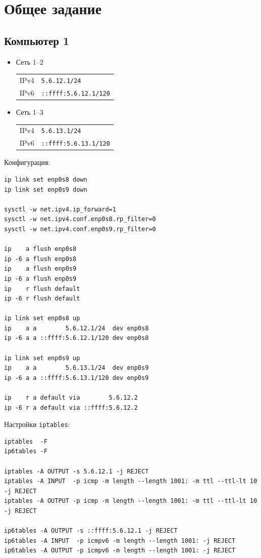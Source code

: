 
\newpage

\section{Общее задание}

\subsection{Компьютер 1}
\begin{itemize}
    \item Сеть 1--2

    \begin{tabular}{ll}
        IPv4 & \texttt{5.6.12.1/24}         \\
        IPv6 & \texttt{::ffff:5.6.12.1/120} \\
    \end{tabular}

    \item Сеть 1--3

    \begin{tabular}{ll}
        IPv4 & \texttt{5.6.13.1/24}         \\
        IPv6 & \texttt{::ffff:5.6.13.1/120} \\
    \end{tabular}
\end{itemize}

Конфигурация:
\begin{verbatim}
ip link set enp0s8 down
ip link set enp0s9 down

sysctl -w net.ipv4.ip_forward=1
sysctl -w net.ipv4.conf.enp0s8.rp_filter=0
sysctl -w net.ipv4.conf.enp0s9.rp_filter=0

ip    a flush enp0s8
ip -6 a flush enp0s8
ip    a flush enp0s9
ip -6 a flush enp0s9
ip    r flush default
ip -6 r flush default

ip link set enp0s8 up
ip    a a        5.6.12.1/24  dev enp0s8
ip -6 a a ::ffff:5.6.12.1/120 dev enp0s8

ip link set enp0s9 up
ip    a a        5.6.13.1/24  dev enp0s9
ip -6 a a ::ffff:5.6.13.1/120 dev enp0s9

ip    r a default via        5.6.12.2
ip -6 r a default via ::ffff:5.6.12.2
\end{verbatim}

Настройки \texttt{iptables}:
\begin{verbatim}
iptables  -F
ip6tables -F

iptables -A OUTPUT -s 5.6.12.1 -j REJECT
iptables -A INPUT  -p icmp -m length --length 1001: -m ttl --ttl-lt 10 -j REJECT
iptables -A OUTPUT -p icmp -m length --length 1001: -m ttl --ttl-lt 10 -j REJECT

ip6tables -A OUTPUT -s ::ffff:5.6.12.1 -j REJECT
ip6tables -A INPUT  -p icmpv6 -m length --length 1001: -j REJECT
ip6tables -A OUTPUT -p icmpv6 -m length --length 1001: -j REJECT
\end{verbatim}

